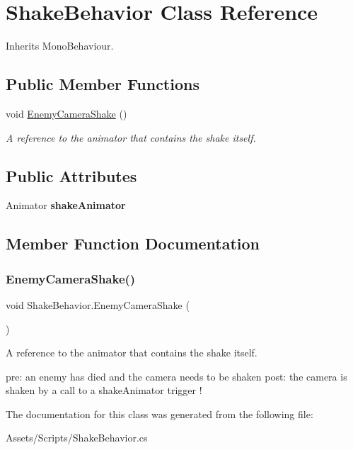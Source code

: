 \hypertarget{class_shake_behavior}{}\section{Shake\+Behavior Class Reference}
\label{class_shake_behavior}


Inherits Mono\+Behaviour.

\subsection*{Public Member Functions}
\begin{DoxyCompactItemize}
\item 
void \mbox{\hyperlink{class_shake_behavior_aa7d0f4a5ab0a8f566ce5203fe9f4b229}{Enemy\+Camera\+Shake}} ()
\begin{DoxyCompactList}\small\item\em A reference to the animator that contains the shake itself. \end{DoxyCompactList}\end{DoxyCompactItemize}
\subsection*{Public Attributes}
\begin{DoxyCompactItemize}
\item 
\mbox{\label{class_shake_behavior_aae508c1977572a978bd931512057da10}} 
Animator {\bfseries shake\+Animator}
\end{DoxyCompactItemize}


\subsection{Member Function Documentation}
\mbox{\label{class_shake_behavior_aa7d0f4a5ab0a8f566ce5203fe9f4b229}} 
\subsubsection{\texorpdfstring{EnemyCameraShake()}{EnemyCameraShake()}}
{\footnotesize\ttfamily void Shake\+Behavior.\+Enemy\+Camera\+Shake (\begin{DoxyParamCaption}{ }\end{DoxyParamCaption})}



A reference to the animator that contains the shake itself. 

pre\+: an enemy has died and the camera needs to be shaken post\+: the camera is shaken by a call to a shake\+Animator trigger ! 

The documentation for this class was generated from the following file\+:\begin{DoxyCompactItemize}
\item 
Assets/\+Scripts/Shake\+Behavior.\+cs\end{DoxyCompactItemize}
